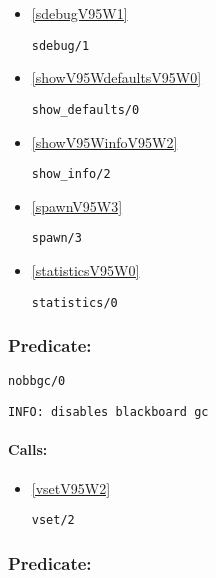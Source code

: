 \begin{itemize}
\item \ref{sdebugV95W1} 
\begin{verbatim}
sdebug/1
\end{verbatim}

\item \ref{showV95WdefaultsV95W0} 
\begin{verbatim}
show_defaults/0
\end{verbatim}

\item \ref{showV95WinfoV95W2} 
\begin{verbatim}
show_info/2
\end{verbatim}

\item \ref{spawnV95W3} 
\begin{verbatim}
spawn/3
\end{verbatim}

\item \ref{statisticsV95W0} 
\begin{verbatim}
statistics/0
\end{verbatim}

\end{itemize}

\subsubsection{Predicate:} \label{nobbgcV95W0}

\begin{verbatim}
nobbgc/0
\end{verbatim}

{\small \begin{verbatim}
INFO: disables blackboard gc

\end{verbatim}}
\paragraph{Calls:} 
\begin{itemize}
\item \ref{vsetV95W2} 
\begin{verbatim}
vset/2
\end{verbatim}

\end{itemize}

\subsubsection{Predicate:} \label{nogcV95W0}


